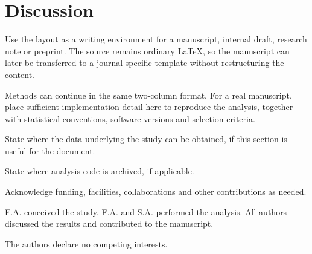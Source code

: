 \documentclass[10pt,a4paper,twocolumn]{article}
\begin{document}
\section{Discussion}
Use the layout as a writing environment for a manuscript, internal draft, research note or preprint. The source remains ordinary \LaTeX{}, so the manuscript can later be transferred to a journal-specific template without restructuring the content.

\methods
Methods can continue in the same two-column format. For a real manuscript, place sufficient implementation detail here to reproduce the analysis, together with statistical conventions, software versions and selection criteria.

\dataavailability
State where the data underlying the study can be obtained, if this section is useful for the document.

\codeavailability
State where analysis code is archived, if applicable.

\acknowledgements
Acknowledge funding, facilities, collaborations and other contributions as needed.

\authorcontributions
F.A. conceived the study. F.A. and S.A. performed the analysis. All authors discussed the results and contributed to the manuscript.

\competinginterests
The authors declare no competing interests.



\makeendmatter
\end{document}
